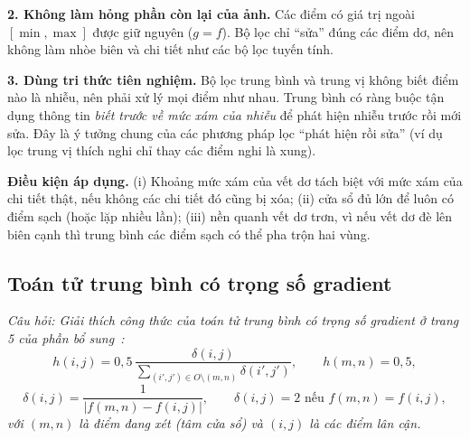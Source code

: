 \textbf{2. Không làm hỏng phần còn lại của ảnh.} Các điểm có giá trị ngoài $[\min, \max]$ được giữ nguyên ($g = f$). Bộ lọc chỉ ``sửa'' đúng các điểm dơ, nên không làm nhòe biên và chi tiết như các bộ lọc tuyến tính.

\textbf{3. Dùng tri thức tiên nghiệm.} Bộ lọc trung bình và trung vị không biết điểm nào là nhiễu, nên phải xử lý mọi điểm như nhau. Trung bình có ràng buộc tận dụng thông tin \emph{biết trước về mức xám của nhiễu} để phát hiện nhiễu trước rồi mới sửa. Đây là ý tưởng chung của các phương pháp lọc ``phát hiện rồi sửa'' (ví dụ lọc trung vị thích nghi chỉ thay các điểm nghi là xung).

\textbf{Điều kiện áp dụng.} (i) Khoảng mức xám của vết dơ tách biệt với mức xám của chi tiết thật, nếu không các chi tiết đó cũng bị xóa; (ii) cửa sổ đủ lớn để luôn có điểm sạch (hoặc lặp nhiều lần); (iii) nền quanh vết dơ trơn, vì nếu vết dơ đè lên biên cạnh thì trung bình các điểm sạch có thể pha trộn hai vùng.

\subsection{Toán tử trung bình có trọng số gradient}
\label{subsec:w6_gradient_weighted}

\textit{Câu hỏi: Giải thích công thức của toán tử trung bình có trọng số gradient ở trang 5 của phần bổ sung~\citep{xlav_lec5b}:
\[
h(i, j) = 0{,}5\,\frac{\delta(i, j)}{\sum_{(i', j') \in O \setminus (m, n)} \delta(i', j')}, \qquad h(m, n) = 0{,}5,
\]
\[
\delta(i, j) = \frac{1}{|f(m, n) - f(i, j)|}, \qquad \delta(i, j) = 2 \text{ nếu } f(m, n) = f(i, j),
\]
với $(m, n)$ là điểm đang xét (tâm cửa sổ) và $(i, j)$ là các điểm lân cận.}


